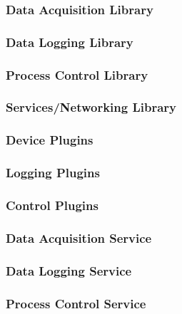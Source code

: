 \documentclass[11pt]{article}
\begin{document}
        

      \subsubsection{Data Acquisition Library}\label{sec:req-srs-daq}

      \subsubsection{Data Logging Library}\label{sec:req-srs-log}

      \subsubsection{Process Control Library}\label{sec:req-srs-ctl}

      \subsubsection{Services/Networking Library}\label{sec:req-srs-net}

      \subsubsection{Device Plugins}\label{sec:req-srs-dev-plug}

      \subsubsection{Logging Plugins}\label{sec:req-srs-log-plug}

      \subsubsection{Control Plugins}\label{sec:req-srs-ctl-plug}

      \subsubsection{Data Acquisition Service}\label{sec:req-srs-daq}

      \subsubsection{Data Logging Service}\label{sec:req-srs-log}

      \subsubsection{Process Control Service}\label{sec:req-srs-control}
\end{document}
